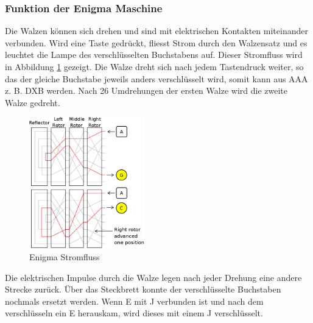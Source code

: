 \subsubsection{Funktion der Enigma Maschine}
Die Walzen können sich drehen und sind mit elektrischen Kontakten miteinander verbunden. Wird eine Taste gedrückt, fliesst Strom durch den Walzensatz und es leuchtet die Lampe des verschlüsselten Buchstabens auf. Dieser Stromfluss wird in Abbildung \ref{fig:stromfluss} gezeigt. Die Walze dreht sich nach jedem Tastendruck weiter, so das der gleiche Buchstabe jeweils anders verschlüsselt wird, somit kann aus AAA z. B. DXB werden. Nach 26 Umdrehungen der ersten Walze wird die zweite Walze gedreht. \\
%
\begin{figure}[ht]
\begin{center}
\includegraphics[width=5cm]{images/Enigma-action.png}
\caption{Enigma Stromfluss}
\label{fig:stromfluss}
\end{center}
\end{figure}
%
Die elektrischen Impulse durch die Walze legen nach jeder Drehung eine andere Strecke zurück. 
Über das Steckbrett konnte der verschlüsselte Buchstaben nochmals ersetzt werden. Wenn E mit J verbunden ist und nach dem verschlüsseln ein E herauskam, wird dieses mit einem J verschlüsselt. 
%
